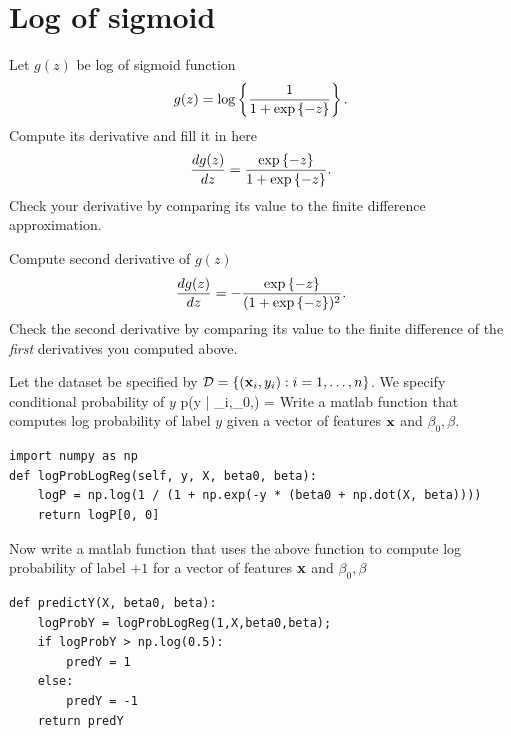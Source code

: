 \documentclass{article}
\begin{document}
\section*{Log of sigmoid}
\newproblem{1pt}
Let $g(z)$ be log of sigmoid function
\[
g(z) = \mathop{\rm log}\left\{ \frac{1}{1+ \mathop{\rm exp}\left\{-z\right\}} \right\}.
\]
Compute its derivative and fill it in here
\[
\frac{dg(z)}{dz} =   \frac{\myexp{-z}}{1 + \myexp{-z}}.%
\]
Check your derivative by comparing its value to the finite difference approximation.


\newproblem{1pt}
Compute second derivative of $g(z)$
\[
\frac{dg(z)}{dz} =  - \frac{\myexp{-z}}{(1 + \myexp{-z})^2}.%
\]
Check the second derivative by comparing its value to the finite difference of the {\em first} derivatives you computed above.


\newproblem{1pt}
Let the dataset be specified by $\mathcal{D} = \left\{ (\mathbf{x}_i,y_i):i=1,\dots,n \right\}$. We specify conditional probability of $y$
\BEQ \label{eq:plr}
p(y | \xx_i,\beta_0,\beta) = 
\EEQ
Write a matlab function that computes log probability of label $y$ given a vector of features $\mathbf{x}$ and $\beta_0,\beta$.
\begin{lstlisting}
import numpy as np
def logProbLogReg(self, y, X, beta0, beta):
	logP = np.log(1 / (1 + np.exp(-y * (beta0 + np.dot(X, beta))))
	return logP[0, 0]
\end{lstlisting}
Now write a matlab function that uses the above function to compute log probability of label $+1$ for a vector of features $\mathbf{x}$ and $\beta_0,\beta$
\begin{lstlisting}
def predictY(X, beta0, beta):
	logProbY = logProbLogReg(1,X,beta0,beta);
	if logProbY > np.log(0.5):
		predY = 1
	else:
		predY = -1
	return predY
\end{lstlisting}
\end{document}
